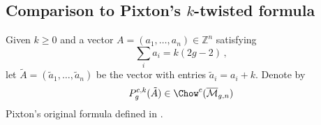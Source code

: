




\subsection{Comparison to Pixton's \texorpdfstring{$k$}{k}-twisted  formula}\label{sec:pixton_ktwist_vs_univ}
Given $k \geq 0$ and a vector $A =(a_1,\ldots,a_n) \in \mathbb{Z}^n$ satisfying $$\sum_i a_i = k(2g-2)\, ,$$
let $\tilde A = (\tilde{a}_1,\ldots,\tilde{a}_n)$ be the vector with entries $\tilde a_i = a_i + k$. Denote by
\[P_g^{c ,k}(\tilde A) \in \Chow^c(\overline{\mathcal{M}}_{g,n})\] Pixton's original formula  defined in \cite[Section 1.1]{Janda2016Double-ramifica}.

